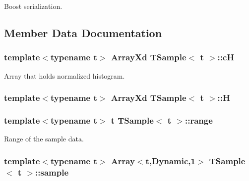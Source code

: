 Boost serialization. 



\subsection{Member Data Documentation}
\hypertarget{class_t_sample_aedda743fb903732544bf50bdc57ffcee}{
\subsubsection[{c\-H}]{\setlength{\rightskip}{0pt plus 5cm}template$<$typename t$>$ Array\-Xd {\bf T\-Sample}$<$ t $>$\-::c\-H\hspace{0.3cm}{\ttfamily [protected]}}}\label{class_t_sample_aedda743fb903732544bf50bdc57ffcee}


Array that holds normalized histogram. 

\hypertarget{class_t_sample_a95cd9ef96fc962a75c1bd1a54e7ed792}{
\subsubsection[{H}]{\setlength{\rightskip}{0pt plus 5cm}template$<$typename t$>$ Array\-Xd {\bf T\-Sample}$<$ t $>$\-::H\hspace{0.3cm}{\ttfamily [protected]}}}\label{class_t_sample_a95cd9ef96fc962a75c1bd1a54e7ed792}
\hypertarget{class_t_sample_ae92afde393f607aa4bb3db700be0d741}{
\subsubsection[{range}]{\setlength{\rightskip}{0pt plus 5cm}template$<$typename t$>$ t {\bf T\-Sample}$<$ t $>$\-::range\hspace{0.3cm}{\ttfamily [protected]}}}\label{class_t_sample_ae92afde393f607aa4bb3db700be0d741}
Range of the sample data. \hypertarget{class_t_sample_a86a1507fc39a77dd81c298a420d47d27}{
\subsubsection[{sample}]{\setlength{\rightskip}{0pt plus 5cm}template$<$typename t$>$ Array$<$t,Dynamic,1$>$ {\bf T\-Sample}$<$ t $>$\-::sample\hspace{0.3cm}{\ttfamily [protected]}}}\label{class_t_sample_a86a1507fc39a77dd81c298a420d47d27}


